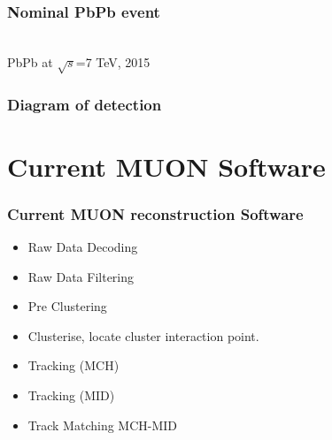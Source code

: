 \documentclass{beamer}
\begin{document}
\begin{frame}
  \frametitle{Nominal PbPb event}
 \\
PbPb at $\sqrt{s}$=7 TeV, 2015 \\
\end{frame}

\begin{frame}
  \frametitle{Diagram of detection}
\end{frame}


\section{Current MUON Software}

\begin{frame}
\frametitle{Current MUON reconstruction Software}
\begin{itemize}
  \item Raw Data Decoding
  \item Raw Data Filtering
  \item Pre Clustering 
  \item Clusterise, locate cluster interaction point.
  \item Tracking (MCH)
  \item Tracking (MID)
  \item Track Matching MCH-MID
\end{itemize}
\end{frame}
\end{document}
